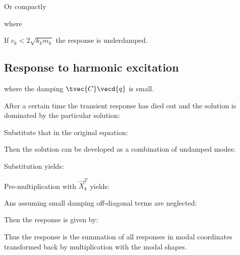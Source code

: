 \documentclass[10pt,a4paper]{scrartcl}
\begin{document}
\begin{multicols*}{2}
Or compactly


where


If $c_k<2\sqrt{k_km_k}$ the response is underdamped.

\subsection{Response to harmonic excitation}


where the damping $\tvec{C}\vecd{q}$ is small.

After a certain time the transient response has died out and the solution is dominated by the particular solution:


Substitute that in the original equation:


Then the solution can be developed as a combination of undamped modes:


Substitution yields:


Pre-multiplication with $\vec{X}_k^T$ yields:


Ans assuming small damping off-diagonal terms are neglected:


Then the response is given by:


Thus the response is the summation of all responses in modal coordinates transformed back by multiplication with the modal shapes.


\end{multicols*}
\end{document}
